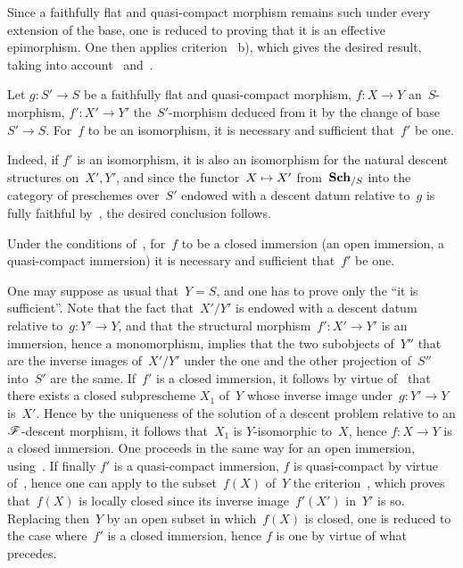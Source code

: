 Since a faithfully flat and quasi-compact morphism remains such under
every extension of the base, one is reduced to proving that it is
an effective epimorphism. One then applies
criterion~ b), which gives the desired result, taking
into account~ and~.

\begin{corollary}
\label{VIII.5.4}
Let $g\colon S'\to S$ be a faithfully flat and
quasi-compact morphism, $f\colon X\to Y$ an~$S$-morphism, $f'\colon X'\to Y'$
the~$S'$-morphism deduced from it by the change of base~$S'\to
S$. For~$f$ to be an isomorphism, it is necessary and sufficient that~$f'$
be one.
\end{corollary}

Indeed, if $f'$ is an isomorphism, it is also an isomorphism
for the natural descent structures on~$X',Y'$, and since the
functor~$X\mto X'$ from~$\mathbf{Sch}_{/S}$ into the category of
preschemes over~$S'$ endowed with a descent datum
relative to~$g$ is fully faithful by~,
the desired conclusion follows.

\begin{corollary}
\label{VIII.5.5}
Under the conditions of~, for~$f$ to be a closed
immersion (\resp an open immersion, \resp a quasi-compact
immersion) it is necessary and sufficient that~$f'$ be one.
\end{corollary}

One may suppose as usual that~$Y=S$, and one has to prove
only the ``it is sufficient''. Note that the fact that~$X'/Y'$ is endowed
with a descent datum relative to~$g\colon Y'\to Y$, and
that the structural morphism~$f'\colon X'\to Y'$ is an immersion,
hence a monomorphism, implies that the two subobjects of~$Y''$
that are the inverse images
of~$X'/Y'$ under the one and the other projection of~$S''$ into~$S'$
are the same. If~$f'$ is a closed immersion, it
follows by virtue of~ that there exists a
closed subprescheme $X_{1}$ of~$Y$ whose inverse image
under~$g\colon Y'\to Y$ is~$X'$. Hence by the uniqueness of the solution
of a descent problem relative to an
$\cal{F}$-descent morphism,
it
follows that~$X_{1}$ is $Y$-isomorphic to~$X$, hence $f\colon
X\to Y$ is a closed immersion. One proceeds in the same way for
an open immersion, using~. If finally $f'$ is
a quasi-compact immersion, $f$ is quasi-compact by virtue
of~, hence one can apply to the subset~$f(X)$
of~$Y$ the criterion~, which proves that~$f(X)$ is
locally closed since its inverse image~$f'(X')$ in~$Y'$
is so. Replacing then~$Y$ by an open subset in
which~$f(X)$ is closed, one is reduced to the case where~$f'$
is a closed immersion, hence $f$ is one by virtue of what
precedes.

